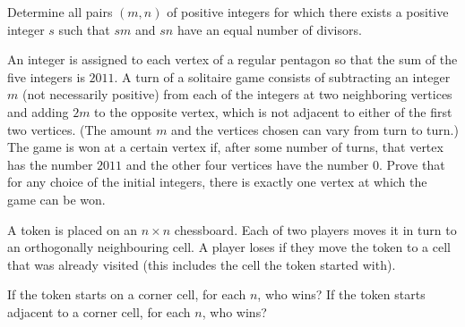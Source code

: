 \begin{problem}
Determine all pairs $(m, n)$ of positive integers
for which there exists a positive integer $s$
such that $sm$ and $sn$ have an equal number of divisors.
\end{problem} 



\begin{reqproblem}
	An integer is assigned to each vertex of a regular pentagon
	so that the sum of the five integers is $2011$.
	A turn of a solitaire game consists of subtracting an integer $m$
	(not necessarily positive) from each of the integers at two neighboring vertices
	and adding $2m$ to the opposite vertex, which is not adjacent
	to either of the first two vertices.
	(The amount $m$ and the vertices chosen can vary from turn to turn.)
	The game is won at a certain vertex if, after some number of turns,
	that vertex has the number $2011$ and the other four vertices have the number $0$.
	Prove that for any choice of the initial integers,
	there is exactly one vertex at which the game can be won.
\end{reqproblem} 



\begin{problem}
A token is placed on an $n\times n$ chessboard.
Each of two players moves it in turn to an orthogonally neighbouring cell.
A player loses if they move the token to a cell that was already visited
(this includes the cell the token started with).
\begin{enumerate}[(a)]
	\ii If the token starts on a corner cell, for each $n$, who wins?
	\ii If the token starts adjacent to a corner cell, for each $n$, who wins?
\end{enumerate}
\end{problem} 


